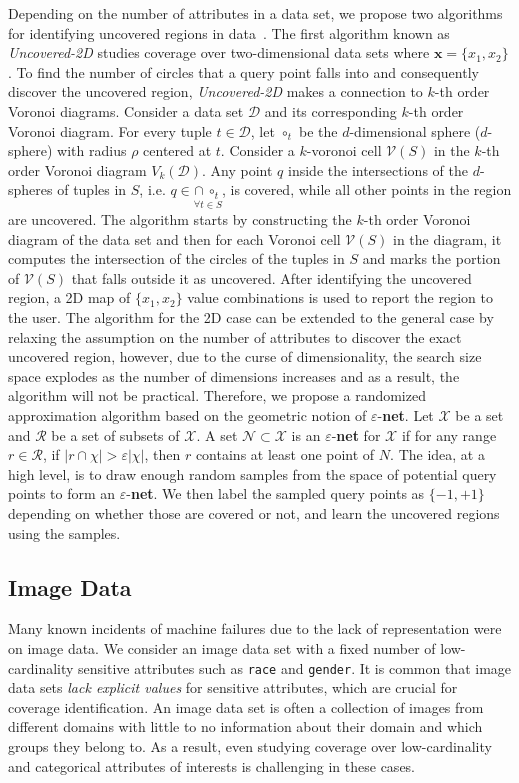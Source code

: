 \documentclass[11pt]{article}
\newcommand{\eps}{\varepsilon}
\newcommand{\enet}{{$\varepsilon$-{\bf net}}\xspace}
\begin{document}
Depending on the number of attributes in a data set, we propose two algorithms for identifying uncovered regions in data~\cite{asudeh2021coverage}. 
The first algorithm known as \textit{Uncovered-2D} studies coverage over two-dimensional data sets where $\mathbf{x}=\{x_1,x_2\}$. To find the number of circles that a query point falls into and consequently discover the uncovered region, \textit{Uncovered-2D} makes a connection to $k$-th order Voronoi diagrams.
Consider a data set $\mathcal{D}$ and its corresponding $k$-th order Voronoi diagram. For every tuple $t\in \mathcal{D}$, let $\circ_t$ be the $d$-dimensional sphere ($d$-sphere) with radius $\rho$ centered at $t$.
Consider a $k$-voronoi cell $\mathcal{V}(S)$ in the $k$-th order Voronoi diagram $V_k(\mathcal{D})$.
Any point $q$ inside the intersections of the $d$-spheres of tuples in $S$, i.e. $q\in \underset{\forall t\in S}{\cap ~\circ_t}$, is covered, while all other points in the region are uncovered.
 The algorithm starts by constructing the $k$-th order Voronoi diagram of the data set and then for each Voronoi cell $\mathcal{V}(S)$ in the diagram, it computes the intersection of the circles of the tuples in $S$ and marks the portion of $\mathcal{V}(S)$ that falls outside it as uncovered.
After identifying the uncovered region, a 2D map of $\{x_1,x_2\}$ value combinations is used to report the region to the user.
The algorithm for the 2D case can be extended to the general case by relaxing the assumption on the number of attributes to discover the exact uncovered region, however, due to the curse of dimensionality, the search size space explodes as the number of dimensions increases and as a result, the algorithm will not be practical. Therefore, we propose a randomized approximation algorithm based on the geometric notion of \enet. 
Let $\mathcal{X}$ be a set and $\mathcal{R}$ be a set of subsets of $\mathcal{X}$. A set $\mathcal{N}\subset \mathcal{X}$ is an \enet for $\mathcal{X}$ if for any range $r\in\mathcal{R}$, if  $|r\cap \chi|>\eps|\chi|$, then $r$ contains at least one point of $N$.
The idea, at a high level, is to draw enough random samples from the space of potential query points to form an \enet. 
We then label the sampled query points as $\{-1,+1\}$ depending on whether those are covered or not, and learn the uncovered regions using the samples.

\subsection{Image Data}
Many known incidents of machine failures due to the lack of representation were on image data.
We consider an image data set with a fixed number of low-cardinality sensitive attributes such as {\tt\small race} and {\tt\small gender}. 
It is common that image data sets {\it lack explicit values} for sensitive attributes, which are crucial for coverage identification. An image data set is often a collection of images from different domains with little to no information about their domain and which groups they belong to. As a result, even studying coverage over low-cardinality and categorical attributes of interests is challenging in these cases.
\end{document}
